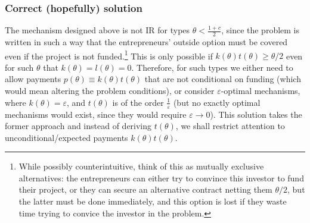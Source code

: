 \documentclass[a4paper]{article}
\begin{document}
	\subsubsection*{Correct (hopefully) solution}
	
	The mechanism designed above is not IR for types $\theta < \frac{1+c}{2}$, since the problem is written in such a way that the entrepreneurs' outside option must be covered even if the project is not funded.\footnote{While possibly counterintuitive, think of this as mutually exclusive alternatives: the entrepreneurs can either try to convince this investor to fund their project, or they can secure an alternative contract netting them $\theta/2$, but the latter must be done immediately, and this option is lost if they waste time trying to convice the investor in the problem.}
	This is only possible if $k(\theta)t(\theta) \geq \theta/2$ even for such $\theta$ that $k(\theta)=l(\theta)=0$. Therefore, for such types we either need to allow payments $p(\theta) \equiv k(\theta)t(\theta)$ that are not conditional on funding (which would mean altering the problem conditions), or consider $\varepsilon$-optimal mechanisms, where $k(\theta) = \varepsilon$, and $t(\theta)$ is of the order $\frac{1}{\varepsilon}$ (but no exactly optimal mechanisms would exist, since they would require $\varepsilon \to 0$). This solution takes the former approach and instead of deriving $t(\theta)$, we shall restrict attention to unconditional/expected payments $k(\theta)t(\theta)$.
	
\end{document}
